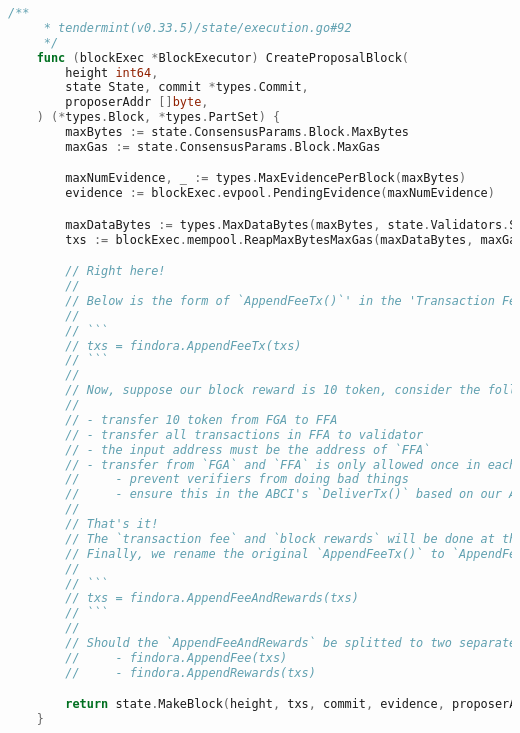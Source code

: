 \begin{lstlisting}[language=go]
    /**
     * tendermint(v0.33.5)/state/execution.go#92
     */
    func (blockExec *BlockExecutor) CreateProposalBlock(
        height int64,
        state State, commit *types.Commit,
        proposerAddr []byte,
    ) (*types.Block, *types.PartSet) {
        maxBytes := state.ConsensusParams.Block.MaxBytes
        maxGas := state.ConsensusParams.Block.MaxGas

        maxNumEvidence, _ := types.MaxEvidencePerBlock(maxBytes)
        evidence := blockExec.evpool.PendingEvidence(maxNumEvidence)

        maxDataBytes := types.MaxDataBytes(maxBytes, state.Validators.Size(), len(evidence))
        txs := blockExec.mempool.ReapMaxBytesMaxGas(maxDataBytes, maxGas)

        // Right here!
        //
        // Below is the form of `AppendFeeTx()`' in the 'Transaction Fee' section:
        //
        // ```
        // txs = findora.AppendFeeTx(txs)
        // ```
        //
        // Now, suppose our block reward is 10 token, consider the following rules:
        //
        // - transfer 10 token from FGA to FFA
        // - transfer all transactions in FFA to validator
        // - the input address must be the address of `FFA`
        // - transfer from `FGA` and `FFA` is only allowed once in each block
        //     - prevent verifiers from doing bad things
        //     - ensure this in the ABCI's `DeliverTx()` based on our APP logic
        //
        // That's it!
        // The `transaction fee` and `block rewards` will be done at the same time.
        // Finally, we rename the original `AppendFeeTx()` to `AppendFeeAndRewards()`:
        //
        // ```
        // txs = findora.AppendFeeAndRewards(txs)
        // ```
        //
        // Should the `AppendFeeAndRewards` be splitted to two separated functions?
        //     - findora.AppendFee(txs)
        //     - findora.AppendRewards(txs)

        return state.MakeBlock(height, txs, commit, evidence, proposerAddr)
    }
\end{lstlisting}

